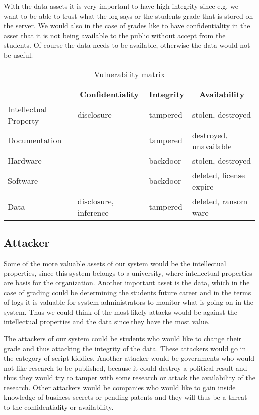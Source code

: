 With the data assets it is very important to have high integrity since e.g. we want to be able to trust what the log says or the students grade that is stored on the server. We would also in the case of grades like to have confidentiality in the asset that it is not being available to the public without accept from the students. Of course the data needs to be available, otherwise the data would not be useful.

\begin{table}[h!]
  \centering
  \begin{tabular}{l|l|l|l}
    \multicolumn{1}{c|}{} & \multicolumn{1}{c|}{\textbf{Confidentiality}} & \multicolumn{1}{c|}{\textbf{Integrity}} & \multicolumn{1}{c}{\textbf{Availability}} \\ \hline
    Intellectual Property & disclosure & tampered & stolen, destroyed \\ \hline
    Documentation & & tampered & destroyed, unavailable \\ \hline
    Hardware & & backdoor & stolen, destroyed \\ \hline
    Software & & backdoor & deleted, license expire \\ \hline
    Data & disclosure, inference & tampered & deleted, ransom ware
  \end{tabular}
  \caption{\label{tbl:vul-matrix} Vulnerability matrix}
\end{table}

\subsection{Attacker}
Some of the more valuable assets of our system would be the intellectual properties, since this system belongs to a university, where intellectual properties are basis for the organization. Another important asset is the data, which in the case of grading could be determining the students future career and in the terms of logs it is valuable for system administrators to monitor what is going on in the system. Thus we could think of the most likely attacks would be against the intellectual properties and the data since they have the most value.

The attackers of our system could be students who would like to change their grade and thus attacking the integrity of the data. These attackers would go in the category of script kiddies. Another attacker would be governments who would not like research to be published, because it could destroy a political result and thus they would try to tamper with some research or attack the availability of the research. Other attackers would be companies who would like to gain inside knowledge of business secrets or pending patents and they will thus be a threat to the confidentiality or availability.

